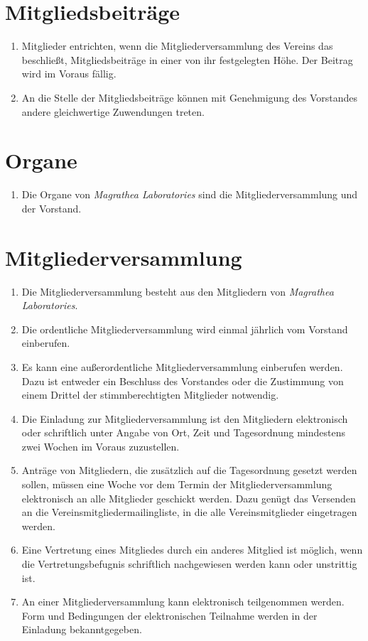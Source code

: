 \documentclass[ngerman]{article}
\begin{document}
\section{Mitgliedsbeiträge}
\begin{enumerate}
\item Mitglieder entrichten, wenn die Mitgliederversammlung des Vereins das beschließt, Mitgliedsbeiträge in einer von ihr festgelegten Höhe. Der Beitrag wird im Voraus fällig.
\item An die Stelle der Mitgliedsbeiträge können mit Genehmigung des Vorstandes andere gleichwertige Zuwendungen treten.
\end{enumerate}

\section{Organe}
\begin{enumerate}
\item Die Organe von \emph{Magrathea Laboratories} sind die Mitgliederversammlung und der Vorstand.
\end{enumerate}

\section{Mitgliederversammlung}
\begin{enumerate}
\item Die Mitgliederversammlung besteht aus den Mitgliedern von \emph{Magrathea Laboratories}.
\item Die ordentliche Mitgliederversammlung wird einmal jährlich vom Vorstand einberufen.
\item Es kann eine außerordentliche Mitgliederversammlung einberufen werden. Dazu ist entweder ein Beschluss des Vorstandes oder die Zustimmung
von einem Drittel der stimmberechtigten Mitglieder notwendig.
\item Die Einladung zur Mitgliederversammlung ist den Mitgliedern elektronisch oder schriftlich unter Angabe von Ort, Zeit und Tagesordnung mindestens zwei Wochen im Voraus zuzustellen.
\item Anträge von Mitgliedern, die zusätzlich auf die Tagesordnung gesetzt werden sollen, müssen eine Woche vor dem Termin der Mitgliederversammlung elektronisch an alle Mitglieder geschickt werden. Dazu genügt das Versenden an die Vereinsmitgliedermailingliste, in die alle Vereinsmitglieder eingetragen werden.
\item Eine Vertretung eines Mitgliedes durch ein anderes Mitglied ist möglich, wenn die Vertretungsbefugnis schriftlich nachgewiesen werden kann oder unstrittig ist.
\item An einer Mitgliederversammlung kann elektronisch teilgenommen werden. Form und Bedingungen der elektronischen Teilnahme werden in der Einladung bekanntgegeben.
\end{enumerate}
\end{document}
